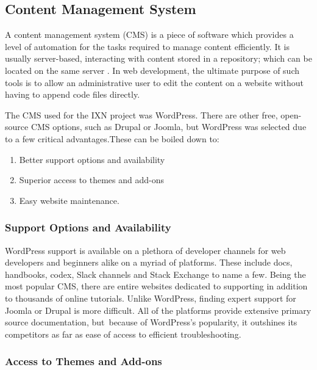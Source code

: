 \documentclass[fontsize=11pt]{extarticle}
\numberwithin{figure}{section} %
\providecommand{\tightlist}{%
  \setlength{\itemsep}{0pt}\setlength{\parskip}{0pt}}
\begin{document}
\hypertarget{content-management-system}{%
\subsection{Content Management System}\label{content-management-system}}

A content management system (CMS) is a piece of software which provides
a level of automation for the tasks required to manage content
efficiently. It is usually server-based, interacting with content stored
in a repository; which can be located on the same server \cite{p1}. In
web development, the ultimate purpose of such tools is to allow an
administrative user to edit the content on a website without having to
append code files directly.

The CMS used for the IXN project was WordPress. There are other free,
open-source CMS options, such as Drupal or Joomla, but WordPress was
selected due to a few critical advantages.These can be boiled down to:

\begin{enumerate}

\tightlist
\item
  Better support options and availability
\item
  Superior access to themes and add-ons
\item
  Easy website maintenance.
\end{enumerate}

\hypertarget{support-options-and-availability}{%
\subsubsection{Support Options and
Availability~}\label{support-options-and-availability}}

WordPress support is available on a plethora of developer channels for
web developers and beginners alike on a myriad of platforms. These
include docs, handbooks, codex, Slack channels and Stack Exchange to
name a few. Being the most popular CMS, there are entire websites
dedicated to supporting in addition to thousands of online tutorials.
Unlike WordPress, finding expert support for Joomla or Drupal is more
difficult. All of the platforms provide extensive primary source
documentation, but~because of WordPress's popularity, it outshines its
competitors as far as ease of access to efficient troubleshooting.~

\hypertarget{access-to-themes-and-add-ons}{%
\subsubsection{Access to Themes and
Add-ons~}\label{access-to-themes-and-add-ons}}
\end{document}
